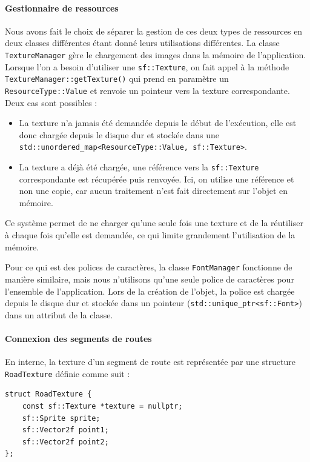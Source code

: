 \paragraph{Gestionnaire de ressources}
Nous avons fait le choix de séparer la gestion de ces deux types de ressources en deux classes différentes étant donné leurs utilisations différentes.
La classe \texttt{TextureManager} gère le chargement des images dans la mémoire de l'application.
Lorsque l'on a besoin d'utiliser une \texttt{sf::Texture}\cite{sfml_sf_texture}, on fait appel à la méthode \texttt{TextureManager::getTexture()} qui prend en paramètre un \texttt{ResourceType::Value} et renvoie un pointeur vers la texture correspondante.
Deux cas sont possibles :
\begin{itemize}
    \item La texture n'a jamais été demandée depuis le début de l'exécution, elle est donc chargée depuis le disque dur et stockée dans une \texttt{std::unordered\_map<ResourceType::Value, sf::Texture>}\cite{cpp_reference_std_unordered_map}.
    \item La texture a déjà été chargée, une référence vers la \texttt{sf::Texture}\cite{sfml_sf_texture} correspondante est récupérée puis renvoyée.
    Ici, on utilise une référence et non une copie, car aucun traitement n'est fait directement sur l'objet en mémoire.
\end{itemize}
Ce système permet de ne charger qu'une seule fois une texture et de la réutiliser à chaque fois qu'elle est demandée, ce qui limite grandement l'utilisation de la mémoire.

Pour ce qui est des polices de caractères, la classe \texttt{FontManager} fonctionne de manière similaire, mais nous n'utilisons qu'une seule police de caractères pour l'ensemble de l'application.
Lors de la création de l'objet, la police est chargée depuis le disque dur et stockée dans un pointeur (\texttt{std::unique\_ptr<sf::Font>}\cite{cpp_reference_std_unique_ptr}) dans un attribut de la classe.

\paragraph{Connexion des segments de routes}
En interne, la texture d'un segment de route est représentée par une structure \texttt{RoadTexture} définie comme suit :

\begin{lstlisting}[style=CStyle,label={lst:struct_roadtexture}]
struct RoadTexture {
    const sf::Texture *texture = nullptr;
    sf::Sprite sprite;
    sf::Vector2f point1;
    sf::Vector2f point2;
};
\end{lstlisting}

